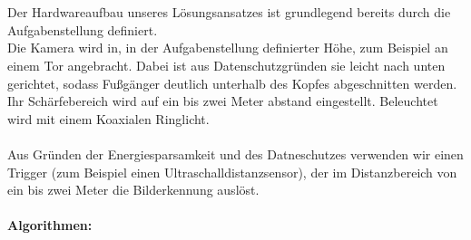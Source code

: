 \documentclass{../Vorlage/sebDenCls}
\begin{document}


\section{}

\section{}

\section{}
Der Hardwareaufbau unseres Lösungsansatzes ist grundlegend bereits durch die Aufgabenstellung definiert.\\
Die Kamera wird in, in der Aufgabenstellung definierter Höhe, zum Beispiel an einem Tor angebracht. Dabei ist aus Datenschutzgründen sie leicht nach unten gerichtet, sodass Fußgänger deutlich unterhalb des Kopfes abgeschnitten werden. Ihr Schärfebereich wird auf ein bis zwei Meter abstand eingestellt. Beleuchtet wird mit einem Koaxialen Ringlicht.\\
\\
Aus Gründen der Energiesparsamkeit und des Datneschutzes verwenden wir einen Trigger (zum Beispiel einen Ultraschalldistanzsensor), der im Distanzbereich von ein bis zwei Meter die Bilderkennung auslöst.\\
\\
\textbf{Algorithmen:}\\\\
\end{document}
